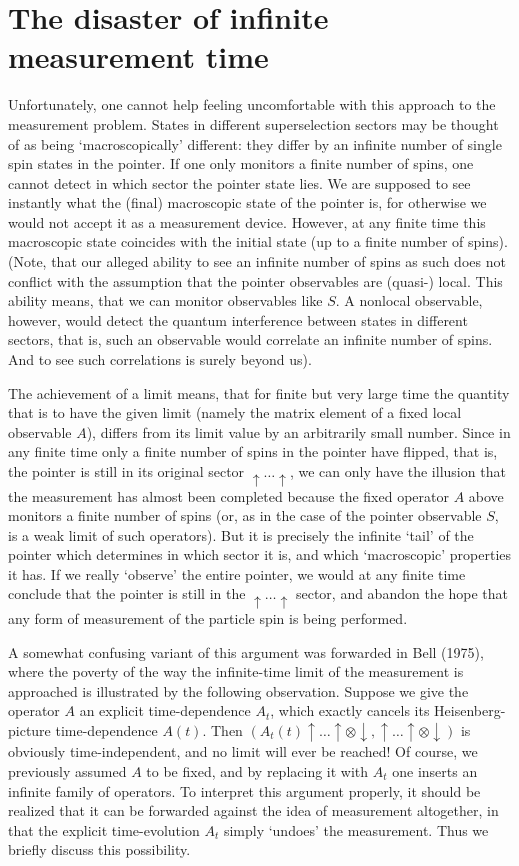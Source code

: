 \documentclass[12pt,titlepage]{article}
\newcommand{\ot}{\otimes}
\newcommand{\dow}{\downarrow}
\newcommand{\Up}{\uparrow\ldots\uparrow}
\begin{document}
\section{The disaster of infinite measurement time}
 Unfortunately, one cannot help feeling
uncomfortable with this approach to the measurement problem.
States in different superselection sectors may be thought of as being
`macroscopically' different:
they differ by an infinite number of  single spin states in the pointer. If one
only monitors a
finite number of spins, one cannot detect in which sector the pointer state
lies. We are supposed
to see instantly what the (final) macroscopic state of the pointer is, for
otherwise we would not
accept it as a measurement device.
However, at any finite time this macroscopic state coincides with the initial
state (up to a finite
number of spins). (Note, that  our
alleged ability to see an infinite number of spins as such does not conflict
with the assumption that
the pointer observables are (quasi-) local.  This ability means, that we can
monitor observables like
$S$. A nonlocal observable, however, would detect the quantum interference
between states in different
sectors, that is, such an observable would correlate an infinite number of
spins. And to see such
correlations is surely beyond us).


The achievement of a limit means, that for finite but very large time the
quantity that is to have
the given limit (namely the matrix element of a fixed local observable $A$),
differs from its limit
value by an arbitrarily small number. Since in any finite time only a finite
number of spins in the
pointer have flipped, that is, the pointer is still in its original sector
$\Up$, we can only have the
illusion that the measurement has almost been completed because the fixed
operator $A$ above monitors
a finite number of spins (or, as in the case of the pointer observable $S$,  is
a weak limit of such
operators). But it is precisely the infinite `tail' of the pointer which
determines in which sector it
is, and which `macroscopic' properties it has. If we really `observe' the
entire pointer, we would at
any finite time conclude that the pointer is still in the $\Up$ sector, and
abandon the hope that any
form of measurement of the particle spin is being performed.

A somewhat confusing variant of  this argument  was forwarded in  Bell (1975),
where the poverty of the way the infinite-time limit of the measurement is
approached is illustrated
by the following observation. Suppose we give the operator $A$ an explicit
time-dependence $A_t$,
which exactly cancels its Heisenberg-picture time-dependence $A(t)$. Then
$(A_t(t)\Up\ot\dow,\Up\ot\dow)$
 is obviously time-independent, and no limit will ever be reached! Of course,
we
previously assumed $A$ to be fixed, and by replacing it with $A_t$ one inserts
an infinite
family  of operators. To interpret this argument properly, it should be
realized
that it can be forwarded against the idea  of measurement altogether, in that
the
explicit time-evolution $A_t$ simply `undoes' the measurement. Thus we briefly
discuss
this possibility.
\end{document}
